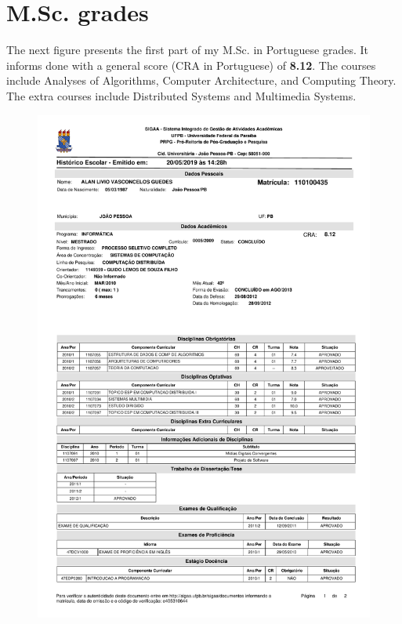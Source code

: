\documentclass[10pt,a4paper,sans,colorlinks]{moderncv}
\begin{document}
\section{M.Sc. grades}
The next figure presents the first part of my M.Sc. in Portuguese grades.
It informs done with a general score (CRA in Portuguese) of \textbf{8.12}.
The courses include Analyses of Algorithms, Computer Architecture, and Computing Theory.
The extra courses include Distributed Systems and Multimedia Systems.
\vspace{1em}
\begin{figure}
    \centering
    \includegraphics[align=t,width=\textwidth,height=0.6\paperheight, keepaspectratio=true, trim=0cm 0cm 0cm 2cm]{certificates/msc-grades.pdf}
\end{figure}
\end{document}

